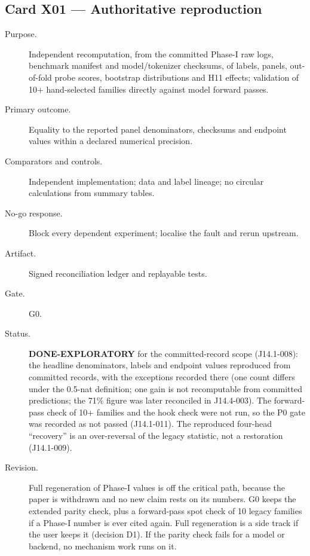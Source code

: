 \documentclass[10pt,a4paper]{article}
\begin{document}
\subsection{Card X01 --- Authoritative reproduction}
\label{card:X01}
\begin{description}
\item[Purpose.] Independent recomputation, from the committed Phase-I raw logs, benchmark manifest and
model/tokenizer checksums, of labels, panels, out-of-fold probe scores, bootstrap distributions and H11 effects;
validation of 10+ hand-selected families directly against model forward passes.
\item[Primary outcome.] Equality to the reported panel denominators, checksums and endpoint values within a
declared numerical precision.
\item[Comparators and controls.] Independent implementation; data and label lineage; no circular calculations
from summary tables.
\item[No-go response.] Block every dependent experiment; localise the fault and rerun upstream.
\item[Artifact.] Signed reconciliation ledger and replayable tests.
\item[Gate.] G0.
\item[Status.] \textbf{DONE-EXPLORATORY} for the committed-record scope (J14.1-008): the headline denominators,
labels and endpoint values reproduced from committed records, with the exceptions recorded there (one count
differs under the 0.5-nat definition; one gain is not recomputable from committed predictions; the 71\% figure
was later reconciled in J14.4-003). The forward-pass check of 10+ families and the hook check were not run, so
the P0 gate was recorded as not passed (J14.1-011). The reproduced four-head ``recovery'' is an over-reversal
of the legacy statistic, not a restoration (J14.1-009).
\item[Revision.] Full regeneration of Phase-I values is off the critical path, because the paper is withdrawn
and no new claim rests on its numbers. G0 keeps the extended parity check, plus a forward-pass spot check of 10
legacy families if a Phase-I number is ever cited again. Full regeneration is a side track if the user keeps it
(decision D1). If the parity check fails for a model or backend, no mechanism work runs on it.
\end{description}

\end{document}

